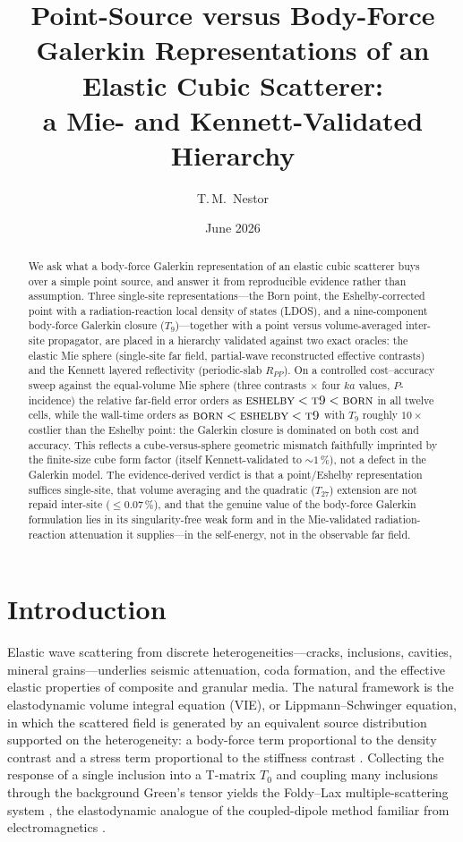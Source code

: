 \documentclass[11pt,a4paper]{article}
\title{Point-Source versus Body-Force Galerkin Representations of an
Elastic Cubic Scatterer:\\ a Mie- and Kennett-Validated Hierarchy}
\author{T.\,M.\ Nestor}
\date{June 2026}
\theoremstyle{plain}
\theoremstyle{definition}
\theoremstyle{remark}
\begin{document}
\maketitle

\begin{abstract}
We ask what a body-force Galerkin representation of an elastic cubic scatterer
buys over a simple point source, and answer it from reproducible evidence rather
than assumption.  Three single-site representations---the Born point, the
Eshelby-corrected point with a radiation-reaction local density of states (LDOS),
and a nine-component body-force Galerkin closure ($T_9$)---together with a
point versus volume-averaged inter-site propagator, are placed in a hierarchy
validated against two exact oracles: the elastic Mie sphere (single-site
far field, partial-wave reconstructed effective contrasts) and the Kennett
layered reflectivity (periodic-slab $R_{PP}$).  On a controlled cost--accuracy
sweep against the equal-volume Mie sphere (three contrasts $\times$ four $ka$
values, $P$-incidence) the relative far-field error orders as
$\textsc{eshelby} < \textsc{t9} < \textsc{born}$ in all twelve cells, while the
wall-time orders as $\textsc{born} < \textsc{eshelby} < \textsc{t9}$ with
$T_9$ roughly $10\times$ costlier than the Eshelby point: the Galerkin closure
is dominated on both cost and accuracy.  This reflects a cube-versus-sphere
geometric mismatch faithfully imprinted by the finite-size cube form factor
(itself Kennett-validated to ${\sim}1\,\%$), not a defect in the Galerkin
model.  The evidence-derived verdict is that a point/Eshelby representation
suffices single-site, that volume averaging and the quadratic ($T_{27}$)
extension are not repaid inter-site ($\le 0.07\,\%$), and that the genuine value
of the body-force Galerkin formulation lies in its singularity-free weak form
and in the Mie-validated radiation-reaction attenuation it supplies---in the
self-energy, not in the observable far field.
\end{abstract}

\tableofcontents

\section{Introduction}\label{sec:intro}

Elastic wave scattering from discrete heterogeneities---cracks, inclusions,
cavities, mineral grains---underlies seismic attenuation, coda formation, and
the effective elastic properties of composite and granular media.  The natural
framework is the elastodynamic volume integral equation (VIE), or
Lippmann--Schwinger equation, in which the scattered field is generated by an
equivalent source distribution supported on the heterogeneity: a body-force
term proportional to the density contrast and a stress term proportional to the
stiffness contrast \cite{mura1987,hudson1980}.  Collecting the response of a
single inclusion into a T-matrix $T_0$ and coupling many inclusions through the
background Green's tensor yields the Foldy--Lax multiple-scattering system
\cite{foldy1945,lax1951,waterman1969}, the elastodynamic analogue of the
coupled-dipole method familiar from electromagnetics \cite{draineflatau1994}.
\end{document}

